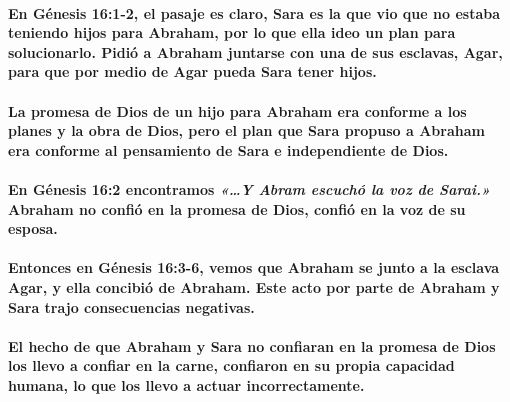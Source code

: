 \documentclass[11a pt,twoside]{article}
\newcommand{\scripture}[1]{%
  {\fontsize{12pt}{16pt}\selectfont\ScriptureFont\itshape #1}%
}
\let\oldparagraph\paragraph
\renewcommand{\paragraph}{\needspace{3\baselineskip}\oldparagraph}
\begin{document}
\paragraph{En Génesis 16:1-2, el pasaje es claro, Sara es la que vio que
no estaba teniendo hijos para Abraham, por lo que ella ideo un plan para
solucionarlo. Pidió a Abraham juntarse con una de sus esclavas, Agar,
para que por medio de Agar pueda Sara tener
hijos.}\label{en-guxe9nesis-161-2-el-pasaje-es-claro-sara-es-la-que-vio-que-no-estaba-teniendo-hijos-para-abraham-por-lo-que-ella-ideo-un-plan-para-solucionarlo.-pidiuxf3-a-abraham-juntarse-con-una-de-sus-esclavas-agar-para-que-por-medio-de-agar-pueda-sara-tener-hijos.}

\paragraph{La promesa de Dios de un hijo para Abraham era conforme a los
planes y la obra de Dios, pero el plan que Sara propuso a Abraham era
conforme al pensamiento de Sara e independiente de
Dios.}\label{la-promesa-de-dios-de-un-hijo-para-abraham-era-conforme-a-los-planes-y-la-obra-de-dios-pero-el-plan-que-sara-propuso-a-abraham-era-conforme-al-pensamiento-de-sara-e-independiente-de-dios.}

\paragraph{\texorpdfstring{En Génesis 16:2 encontramos
\scripture{«…Y Abram escuchó la voz de Sarai.»} Abraham no confió en la
promesa de Dios, confió en la voz de su
esposa.}{En Génesis 16:2 encontramos  Abraham no confió en la promesa de Dios, confió en la voz de su esposa.}}\label{en-guxe9nesis-162-encontramos-y-abram-escuchuxf3-la-voz-de-sarai.-abraham-no-confiuxf3-en-la-promesa-de-dios-confiuxf3-en-la-voz-de-su-esposa.}

\paragraph{Entonces en Génesis 16:3-6, vemos que Abraham se junto a la
esclava Agar, y ella concibió de Abraham. Este acto por parte de Abraham
y Sara trajo consecuencias
negativas.}\label{entonces-en-guxe9nesis-163-6-vemos-que-abraham-se-junto-a-la-esclava-agar-y-ella-concibiuxf3-de-abraham.-este-acto-por-parte-de-abraham-y-sara-trajo-consecuencias-negativas.}

\paragraph{El hecho de que Abraham y Sara no confiaran en la promesa de
Dios los llevo a confiar en la carne, confiaron en su propia capacidad
humana, lo que los llevo a actuar
incorrectamente.}\label{el-hecho-de-que-abraham-y-sara-no-confiaran-en-la-promesa-de-dios-los-llevo-a-confiar-en-la-carne-confiaron-en-su-propia-capacidad-humana-lo-que-los-llevo-a-actuar-incorrectamente.}
\end{document}
